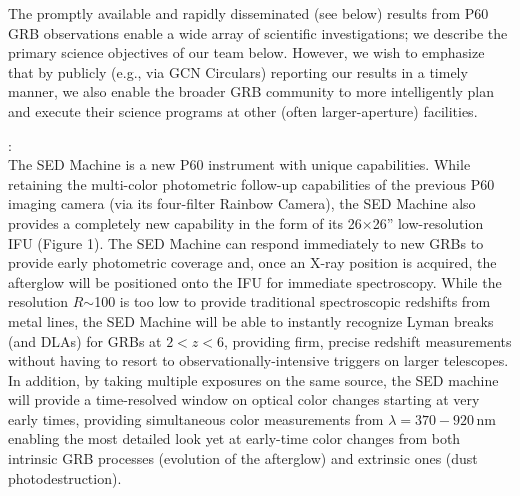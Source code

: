 \documentclass[letterpaper,11pt]{article}
\begin{document}
The promptly available and rapidly disseminated (see below) results
from P60 GRB observations enable a wide array of scientific investigations;
we describe the primary science objectives of our team below.  However, we
wish to emphasize that by publicly (e.g., via GCN Circulars) reporting our
results in a timely manner, we also enable the broader GRB
community to more intelligently plan and execute their science programs
at other (often larger-aperture) facilities. 

:
\smallskip\\
The SED Machine is a new P60 instrument with unique capabilities.  
While retaining the multi-color photometric follow-up capabilities of 
the previous P60 imaging camera (via its four-filter Rainbow Camera), the 
SED Machine also provides a completely new capability in the form of its 
26$\times$26'' low-resolution IFU (Figure 1).  The SED Machine can respond 
immediately to new GRBs to provide early photometric coverage and, once an X-ray 
position is acquired, the afterglow will be positioned onto the IFU for 
immediate spectroscopy.  While the resolution $R$$\sim$100 is too low to 
provide traditional spectroscopic redshifts from metal lines, the SED Machine 
will be able to instantly recognize Lyman breaks (and DLAs) for GRBs at $2 < z < 6$, 
providing firm, precise redshift measurements without having to resort to 
observationally-intensive triggers on larger telescopes.  In addition, by taking 
multiple exposures on the same source, the SED machine will provide a time-resolved 
window on optical color changes starting at very early times, providing 
simultaneous color measurements from $\lambda=370-920$\,nm enabling the most 
detailed look yet at early-time color changes from both intrinsic GRB processes 
(evolution of the afterglow) and extrinsic ones (dust photodestruction). 
\end{document}
